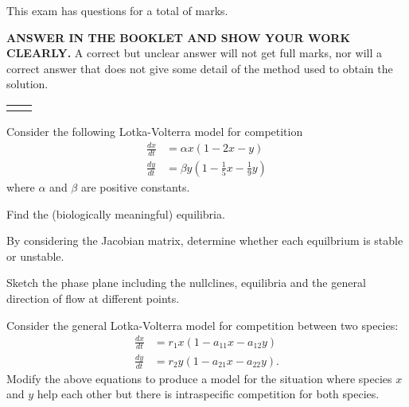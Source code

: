 \documentclass[12pt]{exam}
\def\dxdt{\frac{dx}{dt}}
\def\dydt{\frac{dy}{dt}}
\begin{document}
\vspace{.1in} This exam has \numquestions\;questions for a total of \numpoints\;marks.

\vspace{.2in} \textbf{ANSWER IN THE BOOKLET AND SHOW YOUR WORK CLEARLY.}
A correct but unclear answer will not get full marks, nor will a correct answer
that does not give some detail of the method used to obtain the solution.
\begin{center}
\begin{tabular}{cp{15.5cm}}
\hline
&\\
\end{tabular}
\end{center}



\begin{questions}
\question[20]
Consider the following Lotka-Volterra model for competition
\begin{equation*}
\begin{aligned}
\dxdt &= \alpha x (1 - 2 x -   y)			\\
\dydt &= \beta  y \left(1 - \frac 15 x - \frac 19 y\right)
\end{aligned}
\end{equation*}
where $\alpha$ and $\beta$ are positive constants.
\begin{parts}
\item Find the (biologically meaningful) equilibria.
\item By considering the Jacobian matrix, determine whether each
equilbrium is stable or unstable.
\item Sketch the phase plane including the nullclines, equilibria
and the general direction of flow at different points.
\end{parts}
\question[10]
Consider the general Lotka-Volterra model for competition
between two species:
\begin{equation*}
\begin{aligned}
\dxdt &= r_1 x (1 - a_{11} x - a_{12} y)	\\
\dydt &= r_2 y (1 - a_{21} x - a_{22} y).
\end{aligned}
\end{equation*}
Modify the above equations to produce a model for the situation
where species $x$ and $y$ help each other but there is intraspecific competition for both species.



\end{questions}
\end{document}
